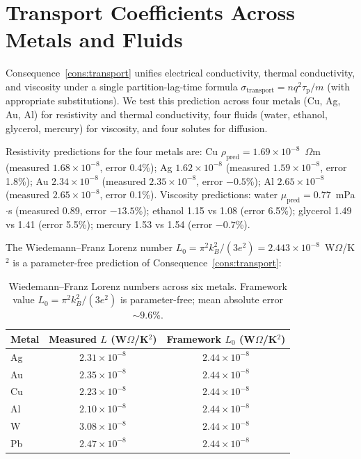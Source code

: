 \documentclass[11pt,twocolumn,a4paper]{article}
\theoremstyle{axiomstyle}
\theoremstyle{conseqstyle}
\theoremstyle{definition}
\theoremstyle{remark}
\newcommand{\taup}{\tau_{\mathrm{p}}}
\begin{document}
\section{Transport Coefficients Across Metals and Fluids}
\label{sec:transportvalidation}

Consequence~\ref{cons:transport} unifies electrical conductivity, thermal conductivity, and viscosity under a single partition-lag-time formula $\sigma_{\text{transport}} = n q^2 \taup / m$ (with appropriate substitutions). We test this prediction across four metals (Cu, Ag, Au, Al) for resistivity and thermal conductivity, four fluids (water, ethanol, glycerol, mercury) for viscosity, and four solutes for diffusion.



Resistivity predictions for the four metals are: Cu $\rho_{\text{pred}}=1.69\times 10^{-8}$~$\Omega$m (measured $1.68\times 10^{-8}$, error 0.4\%); Ag $1.62\times 10^{-8}$ (measured $1.59\times 10^{-8}$, error 1.8\%); Au $2.34\times 10^{-8}$ (measured $2.35\times 10^{-8}$, error $-0.5$\%); Al $2.65\times 10^{-8}$ (measured $2.65\times 10^{-8}$, error 0.1\%). Viscosity predictions: water $\mu_{\text{pred}}=0.77$~mPa$\cdot$s (measured 0.89, error $-13.5$\%); ethanol 1.15 vs 1.08 (error 6.5\%); glycerol 1.49 vs 1.41 (error 5.5\%); mercury 1.53 vs 1.54 (error $-0.7$\%).

The Wiedemann--Franz Lorenz number $L_0 = \pi^2 k_B^2/(3e^2) = 2.443\times 10^{-8}$~W$\Omega$/K$^2$ is a parameter-free prediction of Consequence~\ref{cons:transport}:

\begin{table}[h]
\centering
\begin{tabular}{lcc}
\toprule
Metal & Measured $L$ (W$\Omega$/K$^{2}$) & Framework $L_0$ (W$\Omega$/K$^{2}$) \\
\midrule
Ag & $2.31\times 10^{-8}$ & $2.44\times 10^{-8}$ \\
Au & $2.35\times 10^{-8}$ & $2.44\times 10^{-8}$ \\
Cu & $2.23\times 10^{-8}$ & $2.44\times 10^{-8}$ \\
Al & $2.10\times 10^{-8}$ & $2.44\times 10^{-8}$ \\
W  & $3.08\times 10^{-8}$ & $2.44\times 10^{-8}$ \\
Pb & $2.47\times 10^{-8}$ & $2.44\times 10^{-8}$ \\
\bottomrule
\end{tabular}
\caption{Wiedemann--Franz Lorenz numbers across six metals. Framework value $L_0 = \pi^2 k_B^2/(3e^2)$ is parameter-free; mean absolute error $\sim 9.6$\%.}
\label{tab:wiedemannfranz}
\end{table}
\end{document}
